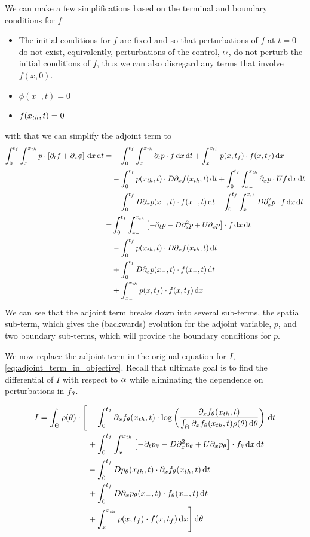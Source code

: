 We can make a few simplifications based on the terminal and boundary
conditions for $f$
\begin{itemize}
  \item The initial conditions for $f$ are fixed and so that perturbations of
  $f$ at $t=0$ do not exist, equivalently, perturbations of the  control, $\alpha$,
  do not perturb the initial conditions of $f$, thus we can also disregard any
  terms that involve $f(x,0)$.
  \item $\phi(x_-, t)=0$
  \item $f({ x_{th} }, t) = 0$ 
\end{itemize}
with that we can simplify the adjoint term to 
\def \tf {{t_f}}
\begin{align*}
\int_0^{\tf} \int_{x_-}^{\xth}
p \cdot \left[\di_t f  + \di_x \phi\right]
	\intd{x}\intd{t} 
=&
-\int_0^{\tf}\int_{x_-}^{\xth} \di_tp \cdot  f \intd{x}\intd{t}
+
\int_{x_-}^{\xth} p(x, \tf) \cdot f(x, \tf) \intd{x}  
\\ 
&- \int_{0}^{\tf} p(\xth,t) \cdot D\di_xf(\xth,t) \intd{t}
 + \int_0^{\tf}\int_{x_-}^{\xth} \di_xp \cdot  U f\intd{x}\intd{t}
\\
&- \int_{0}^{\tf} D\di_xp(x_-,t) \cdot f(x_-,t) \intd{t} 
 - \int_0^{\tf}\int_{x_-}^{\xth} D\di^2_xp \cdot  f\intd{x}\intd{t}
\\
=&
\int_0^{\tf}\int_{x_-}^{\xth} 
	\left[-\di_tp -  D\di^2_xp + U \di_xp \right]\cdot  f
\intd{x}\intd{t}
\\ 
&- \int_{0}^{\tf} p(\xth,t) \cdot D\di_xf(\xth,t) \intd{t}
\\
& + \int_{0}^{\tf} D\di_xp(x_-,t) \cdot f(x_-,t) \intd{t}
\\
& +
\int_{x_-}^{\xth} p(x, \tf) \cdot f(x, \tf) \intd{x} 
\end{align*}
We can see that the adjoint term breaks down into several sub-terms, the spatial
sub-term, which gives the (backwards) evolution for the adjoint variable, $p$,
and two boundary sub-terms, which will provide the boundary conditions for $p$. 

We now replace the adjoint term in the original equation for $I$,
\cref{eq:adjoint_term_in_objective}. Recall that ultimate goal is to find the
differential of $I$ with respect to $\alpha$ while eliminating the
dependence on perturbations in $f_{ \theta}$. 

\begin{align*}
I=  
\int_\Theta  \rho(\th)\cdot \Bigg[ 
&-\int_0^{\tf} 
	  \di_xf_\th(\xth, t)  \cdot 
		\log \left( \frac{\di_xf_\th(\xth, t)}
						{\int_\Theta \di_xf_\th(\xth, t)\rho(\th)\intd{\th} } \right)
\intd{t} 
\\ &+
\int_0^{\tf}\int_{x_-}^{\xth} 
	\left[-\di_tp_\th -  D\di^2_xp_\th + U \di_xp_\th \right]\cdot  f_\th
\intd{x}\intd{t}
\\ 
&- \int_{0}^{\tf} D p_\th(\xth,t) \cdot \di_xf_\th(\xth,t) \intd{t}
\\
& + \int_{0}^{\tf} D\di_xp_\th(x_-,t) \cdot f_\th(x_-,t) \intd{t}
\\	& +
\int_{x_-}^{\xth} p(x, \tf) \cdot f(x, \tf) \intd{x}  
\Bigg]				\intd{\th}   
\end{align*}

